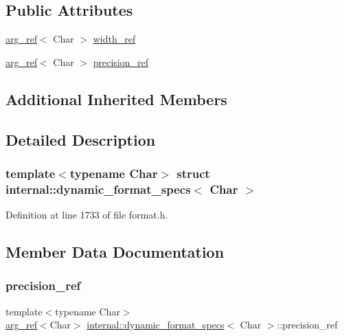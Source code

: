 \subsection*{Public Attributes}
\begin{DoxyCompactItemize}
\item 
\hyperlink{structinternal_1_1arg__ref}{arg\+\_\+ref}$<$ Char $>$ \hyperlink{structinternal_1_1dynamic__format__specs_a5c7f025d6bfdf67ba9a418299e75b79d}{width\+\_\+ref}
\item 
\hyperlink{structinternal_1_1arg__ref}{arg\+\_\+ref}$<$ Char $>$ \hyperlink{structinternal_1_1dynamic__format__specs_ac1bef81ff1191db1c234854a114b9994}{precision\+\_\+ref}
\end{DoxyCompactItemize}
\subsection*{Additional Inherited Members}


\subsection{Detailed Description}
\subsubsection*{template$<$typename Char$>$\newline
struct internal\+::dynamic\+\_\+format\+\_\+specs$<$ Char $>$}



Definition at line 1733 of file format.\+h.



\subsection{Member Data Documentation}
\mbox{\label{structinternal_1_1dynamic__format__specs_ac1bef81ff1191db1c234854a114b9994}} 
\subsubsection{\texorpdfstring{precision\+\_\+ref}{precision\_ref}}
{\footnotesize\ttfamily template$<$typename Char$>$ \\
\hyperlink{structinternal_1_1arg__ref}{arg\+\_\+ref}$<$Char$>$ \hyperlink{structinternal_1_1dynamic__format__specs}{internal\+::dynamic\+\_\+format\+\_\+specs}$<$ Char $>$\+::precision\+\_\+ref}



